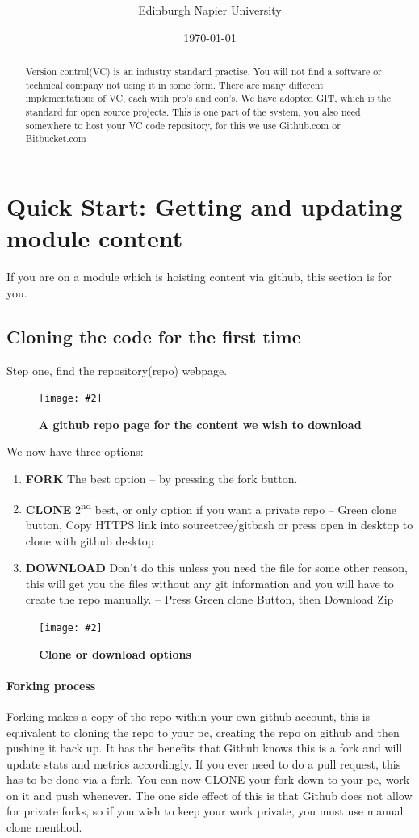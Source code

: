 \documentclass[11pt, a4paper]{article}
\title{\textbf{\mytitle}}
\author{Edinburgh Napier University}
\date{\today}
\newcommand{\figuremacro}[5]{
    \begin{figure}[#1]
        \centering
        \texttt{[image: \#2]}
        \caption[#3]{\textbf{#3}#4}
        \label{fig:#2}
    \end{figure}
}
\newcommand{\ts}{\textsuperscript}
\begin{document}
	 \onecolumn
\maketitle
   
    \begin{abstract}
        Version control(VC) is an industry standard practise. You will not find a software or technical company not using it in some form. There are many different implementations of VC, each with pro's and con's. We have adopted GIT, which is the standard for open source projects. This is one part of the system, you also need somewhere to host your VC code repository, for this we use Github.com or Bitbucket.com
    \end{abstract}
    
    \section{Quick Start: Getting and updating module content}
    If you are on a module which is hoisting content via github, this section is for you.
    \subsection{Cloning the code for the first time}
    Step one, find the repository(repo) webpage. 
      \figuremacro{h}{github_over}{A github repo page for the content we wish to download}{ }{0.8}
    
    We now have three options:
    \begin{enumerate}
    	\item \textbf{FORK} The best option -- by pressing the fork button.
    	\item \textbf{CLONE} 2\ts{nd} best, or only option if you want a private repo -- Green clone button, Copy HTTPS link into sourcetree/gitbash or press open in desktop to clone with github desktop
    	\item \textbf{DOWNLOAD} Don't do this unless you need the file for some other reason, this will get you the files without any git information and you will have to create the repo manually. -- Press Green clone Button, then Download Zip
    \end{enumerate}
    
    \figuremacro{h}{gh-clone-dl}{Clone or download options}{ }{0.35}

	\paragraph{Forking process}
	Forking makes a copy of the repo within your own github account, this is equivalent to cloning the repo to your pc, creating the repo on github and then pushing it back up. It has the benefits that Github knows this is a fork and will update stats and metrics accordingly. If you ever need to do a pull request, this has to be done via a fork. You can now CLONE your fork down to your pc, work on it and push whenever. The one side effect of this is that Github does not allow for private forks, so if you wish to keep your work private, you must use manual clone menthod.
\end{document}
